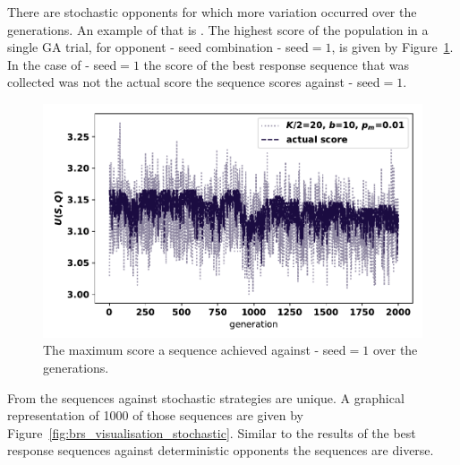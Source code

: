 There are stochastic opponents for which more variation occurred over the
generations. An example of that is \Random. The highest score
of the population in a single GA trial, for opponent - seed combination \Random -
seed\(=1\), is given by Figure~\ref{fig:random_ga_score}.
In the case of \Random - seed\(=1\) the score of the best response sequence that
was collected was not the actual score the sequence scores against \Random -
seed\(=1\).

\begin{figure}[!htbp]
    \centering
    \includegraphics[width=.7\textwidth]{src/chapters/06/img/maximum_score_per_generation_random.pdf}
    \caption{The maximum score a sequence achieved against \Random - seed\(=1\)
    over the generations.}\label{fig:random_ga_score}
\end{figure}

From the \stochasticsequences sequences against stochastic strategies \stochasticuniquesequences are unique. A graphical representation of 1000 of
those sequences are given by Figure~\ref{fig:brs_visualisation_stochastic}.
Similar to the results of the best response sequences against deterministic
opponents the sequences are diverse.

